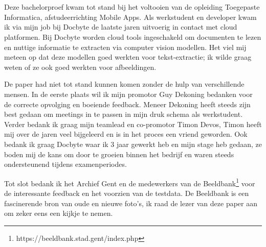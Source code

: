
\chapter*{}
\label{ch:voorwoord}


Deze bachelorproef kwam tot stand bij het voltooien van de opleiding Toegepaste Informatica, afstudeerrichting Mobile Apps. Als werkstudent en developer kwam ik via mijn job bij Docbyte de laatste jaren uitvoerig in contact met cloud platformen. Bij Docbyte worden cloud tools ingeschakeld om documenten te lezen en nuttige informatie te extracten via computer vision modellen. Het viel mij meteen op dat deze modellen goed werkten voor tekst-extractie; ik wilde graag weten of ze ook goed werkten voor afbeeldingen.

De paper had niet tot stand kunnen komen zonder de hulp van verschillende mensen. In de eerste plaats wil ik mijn promotor Guy Dekoning bedanken voor de correcte opvolging en boeiende feedback. Meneer Dekoning heeft steeds zijn best gedaan om meetings in te passen in mijn druk schema als werkstudent. Verder bedank ik graag mijn teamlead en co-promotor Timon Devos, Timon heeft mij over de jaren veel bijgeleerd en is in het proces een vriend geworden. Ook bedank ik graag Docbyte waar ik 3 jaar gewerkt heb en mijn stage heb gedaan, ze boden mij de kans om door te groeien binnen het bedrijf en waren steeds ondersteunend tijdens examenperiodes. 

Tot slot bedank ik het Archief Gent en de medewerkers van de Beeldbank\footnote{https://beeldbank.stad.gent/index.php} voor de interessante feedback en het voorzien van de testdata. De Beeldbank is een fascinerende bron van oude en nieuwe foto's, ik raad de lezer van deze paper aan om zeker eens een kijkje te nemen.